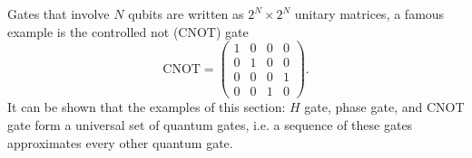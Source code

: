 Gates that involve $N$ qubits are written as $2^N\times 2^N$ unitary matrices, a famous example is the controlled not (CNOT) gate
\begin{equation}
\text{CNOT} = \begin{pmatrix}
1  & 0 & 0 & 0\\
0 & 1 & 0 & 0\\
0 & 0& 0 & 1 \\
0 & 0 & 1 &0
\end{pmatrix}.
\end{equation}
It can be shown \cite{chuang} that the examples of this section: $H$ gate, phase gate, and CNOT gate form a universal set of quantum gates, i.e. a sequence of these gates approximates every other quantum gate.

